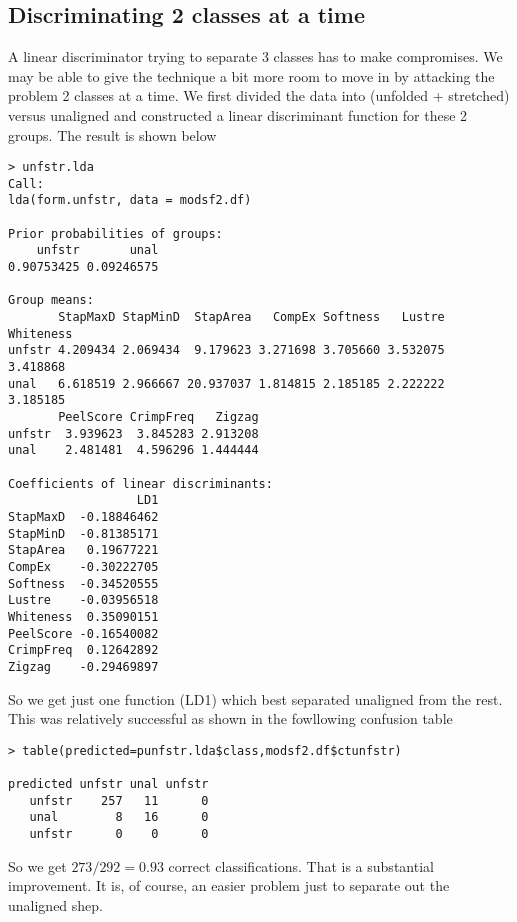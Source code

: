 \documentclass[titlepage]{article}  %
\begin{document}



\subsection{Discriminating 2 classes at a time}
A linear discriminator trying to separate 3 classes has to make compromises. We may be able to give the technique a bit more room to move in by attacking the problem 2 classes at a time. We first divided the data into (unfolded + stretched) versus unaligned and constructed a linear discriminant function for these 2 groups. The result is shown below
\begin{verbatim}
> unfstr.lda
Call:
lda(form.unfstr, data = modsf2.df)

Prior probabilities of groups:
    unfstr       unal 
0.90753425 0.09246575 

Group means:
       StapMaxD StapMinD  StapArea   CompEx Softness   Lustre Whiteness
unfstr 4.209434 2.069434  9.179623 3.271698 3.705660 3.532075  3.418868
unal   6.618519 2.966667 20.937037 1.814815 2.185185 2.222222  3.185185
       PeelScore CrimpFreq   Zigzag
unfstr  3.939623  3.845283 2.913208
unal    2.481481  4.596296 1.444444

Coefficients of linear discriminants:
                  LD1
StapMaxD  -0.18846462
StapMinD  -0.81385171
StapArea   0.19677221
CompEx    -0.30222705
Softness  -0.34520555
Lustre    -0.03956518
Whiteness  0.35090151
PeelScore -0.16540082
CrimpFreq  0.12642892
Zigzag    -0.29469897
\end{verbatim}
So we get just one function (LD1) which best separated unaligned from the rest.
This was relatively successful as shown in the fowllowing confusion table
\begin{verbatim}
> table(predicted=punfstr.lda$class,modsf2.df$ctunfstr)
         
predicted unfstr unal unfstr
   unfstr    257   11      0
   unal        8   16      0
   unfstr      0    0      0
\end{verbatim}
So we get $273/292=0.93$ correct classifications. That is a substantial improvement. It is, of course, an easier problem just to separate out the unaligned shep.
\end{document}
